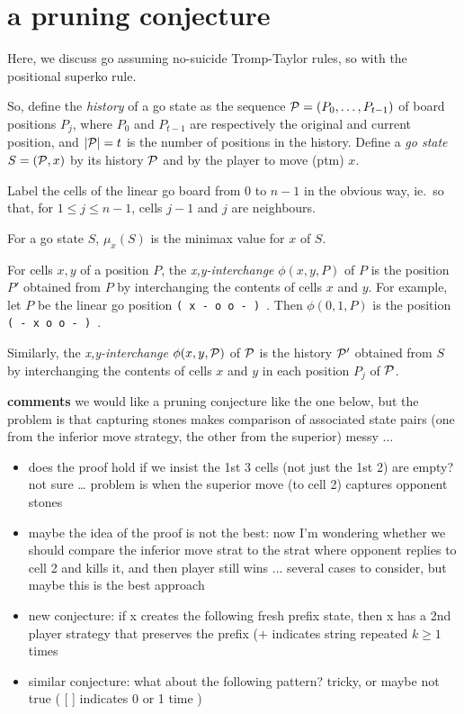 \section*{a pruning conjecture}
Here, we discuss go assuming no-suicide Tromp-Taylor rules,
so with the positional superko rule.

So, define the {\em history} of a go state as the sequence
${\mathcal{P}} = (P_0, \ldots, P_{t-1})$
of board positions $P_j$, 
where $P_0$ and $P_{t-1}$ 
are respectively the original and current position,
and $|{\mathcal{P}}| = t$ is the number of positions in the history.
Define a {\em go state} $S=({\mathcal{P}},x)$ by its history ${\mathcal{P}}$
and by the player to move (ptm) $x$.

Label the cells of the linear go board from 0 to $n-1$
in the obvious way, ie.\ so that,
for $1 \leq j \leq n-1$, cells $j-1$ and $j$ are neighbours.

For a go state $S$, 
$\mu_x(S)$ is the minimax value for $x$ of $S$.

For cells $x,y$ of a position $P$,
the {\em x,y-interchange} $\phi(x,y,P)$ of $P$ is
the position $P'$ obtained from $P$ by 
interchanging the contents of cells $x$ and $y$.
For example,
let $P$ be the linear go position {\tt ( x - o o - ) }.
Then $\phi(0,1,P)$ is the position {\tt ( - x o o - ) }.

Similarly,
the {\em x,y-interchange} $\phi(x,y,{\mathcal{P}})$ of ${\mathcal{P}}$
is the history ${\mathcal{P}}'$ obtained from $S$ by interchanging
the contents of cells $x$ and $y$ in each position $P_j$ of ${\mathcal{P}}$.

{\bf comments}
we would like a pruning conjecture like the one below,
but the problem is that capturing stones makes comparison
of associated state pairs (one from the inferior move strategy,
the other from the superior) messy ...

\begin{itemize}
\item
does the proof hold if we insist the 1st 3 cells (not just the 1st 2)
are empty?  not sure \ldots
problem is when the superior move (to cell 2) captures opponent stones
\item maybe the idea of the proof is not the best: now
I'm wondering whether we should compare the inferior move strat
to the strat where opponent replies to cell 2 and kills it,
and then player still wins ... several cases to consider,
but maybe this is the best approach
\item new conjecture: if x creates the following fresh prefix
state,
then x has a 2nd player strategy that preserves the prefix
($+$ indicates string repeated $k\geq 1$ times
\item
similar conjecture:
what about the following pattern? tricky, or maybe not true
( [ ] indicates 0 or 1 time )
\end{itemize}

